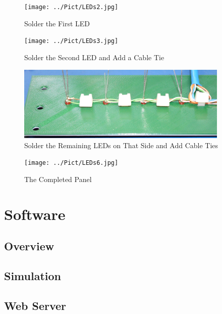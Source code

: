\documentclass[10pt, openany]{book}
\begin{document}
\begin{figure}[ht!]
  \centering
  \texttt{[image: ../Pict/LEDs2.jpg]}
  \caption{Solder the First LED}
  \label{fig:LED2}
\end{figure}

\begin{figure}[ht!]
  \centering
  \texttt{[image: ../Pict/LEDs3.jpg]}
  \caption{Solder the Second LED and Add a Cable Tie}
  \label{fig:LED3}
\end{figure}

\begin{figure}[ht!]
  \centering
  \includegraphics[width=0.9\textwidth]{../Pict/LEDs4.jpg}
  \caption{Solder the Remaining LEDs on That Side and Add Cable Ties}
  \label{fig:LED4}
\end{figure}

\begin{figure}[ht!]
  \centering
  \texttt{[image: ../Pict/LEDs6.jpg]}
  \caption{The Completed Panel}
  \label{fig:LED6}
\end{figure}


\chapter{Software}
\section{Overview}

\section{Simulation}

\section{Web Server}
\end{document}

